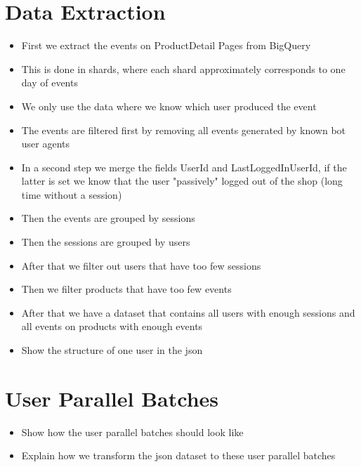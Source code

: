 \section{Data Extraction}
\begin{itemize}
\item First we extract the events on ProductDetail Pages from BigQuery
\item This is done in shards, where each shard approximately corresponds to one day of events
\item We only use the data where we know which user produced the event
\item The events are filtered first by removing all events generated by known bot user agents
\item In a second step we merge the fields UserId and LastLoggedInUserId, if the latter is set we know that the user "passively" logged out of the shop (long time without a session)
\item Then the events are grouped by sessions
\item Then the sessions are grouped by users
\item After that we filter out users that have too few sessions
\item Then we filter products that have too few events
\item After that we have a dataset that contains all users with enough sessions and all events on products with enough events
\item Show the structure of one user in the json
\end{itemize}

\section{User Parallel Batches}
\begin{itemize}
    \item Show how the user parallel batches should look like
    \item Explain how we transform the json dataset to these user parallel batches
\end{itemize}
